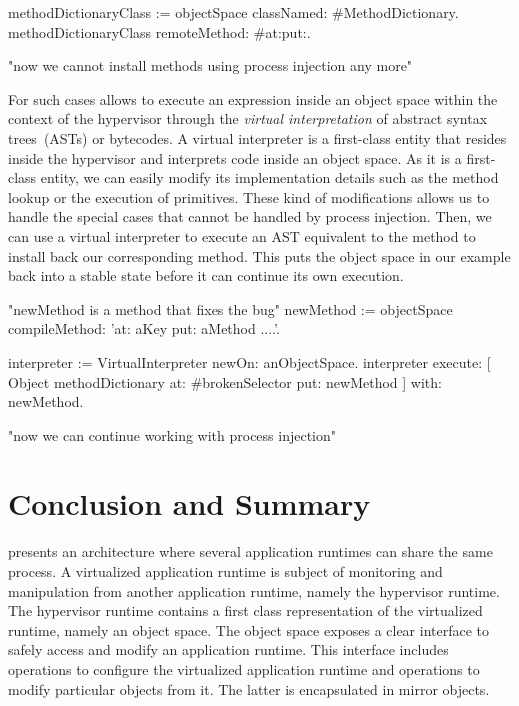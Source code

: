 \begin{code}
methodDictionaryClass := objectSpace classNamed: #MethodDictionary.
methodDictionaryClass remoteMethod: #at:put:.

"now we cannot install methods using process injection any more"
\end{code}

For such cases \Vtt allows to execute an expression inside an object space within the context of the hypervisor through the \emph{virtual interpretation} of \eg abstract syntax trees~(ASTs) or bytecodes. A virtual interpreter is a first-class entity that resides inside the hypervisor and interprets code inside an object space. As it is a first-class entity, we can easily modify its implementation details such as the method lookup or the execution of primitives. These kind of modifications allows us to handle the special cases that cannot be handled by process injection. Then, we can use a virtual interpreter to execute an AST equivalent to the  method to install back our corresponding method. This puts the object space in our example back into a stable state before it can continue its own execution.

\begin{code}
"newMethod is a method that fixes the bug"
newMethod := objectSpace compileMethod: 'at: aKey put: aMethod ....'.

interpreter := VirtualInterpreter newOn: anObjectSpace.
interpreter
	execute: [ Object methodDictionary at: #brokenSelector put: newMethod ]
	with: newMethod.
	
"now we can continue working with process injection"
\end{code}

\section{Conclusion and Summary}

\Vtt presents an architecture where several application runtimes can share the same process. A virtualized application runtime is subject of monitoring and manipulation from another application runtime, namely the hypervisor runtime. The hypervisor runtime contains a first class representation of the virtualized runtime, namely an object space. The object space exposes a clear interface to safely access and modify an application runtime. This interface includes operations to configure the virtualized application runtime and operations to modify particular objects from it. The latter is encapsulated in mirror objects.

